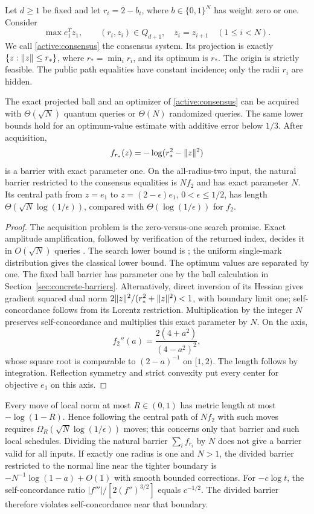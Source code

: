 Let $d\geq1$ be fixed and let $r_i=2-b_i$, where
$b\in\{0,1\}^N$ has weight zero or one. Consider
\begin{equation}\label{active:consensus}
 \max e_1^Tz_1,\qquad
 (r_i,z_i)\in Q_{d+1},\quad z_i=z_{i+1}\quad(1\leq i<N).
\end{equation}
We call \eqref{active:consensus} the consensus system.
Its projection is exactly $\{z:\lVert z\rVert\leq r_*\}$, where
$r_*=\min_i r_i$, and its optimum is $r_*$. The origin is strictly
feasible. The public path equalities have constant incidence; only
the radii $r_i$ are hidden.

\begin{proposition}\label{active:radius}
The exact projected ball and an optimizer of
\eqref{active:consensus} can be acquired with $\Theta(\sqrt N)$
quantum queries or $\Theta(N)$ randomized queries. The same lower
bounds hold for an optimum-value estimate with additive error below
$1/3$. After acquisition,
\[
 f_{r_*}(z)=-\log(r_*^2-\lVert z\rVert^2)
\]
is a barrier with exact parameter one. On the all-radius-two input,
the natural barrier restricted to the consensus equalities is $Nf_2$
and has exact
parameter $N$. Its central path from $z=e_1$ to
$z=(2-\epsilon)e_1$, $0<\epsilon\leq1/2$, has length
$\Theta(\sqrt N\log(1/\epsilon))$, compared with
$\Theta(\log(1/\epsilon))$ for $f_2$.
\end{proposition}
\begin{proof}
The acquisition problem is the zero-versus-one search promise.
Exact amplitude amplification, followed by verification of the returned
index, decides it in $O(\sqrt N)$ queries
\cite[Theorem~16]{BHMT2002}. The search lower bound is
\cite{BBBV1997}; the uniform single-mark distribution gives the
classical lower bound. The optimum values are separated by one.
The fixed ball barrier has parameter one by the ball calculation
in Section~\ref{sec:concrete-barriers}. Alternatively, direct inversion of
its Hessian gives gradient squared dual norm
$2\lVert z\rVert^2/(r_*^2+\lVert z\rVert^2)<1$, with boundary limit one;
self-concordance follows from its Lorentz restriction.
Multiplication by the integer $N$ preserves self-concordance and
multiplies this exact parameter by $N$. On the axis,
\[
 f_2''(a)=\frac{2(4+a^2)}{(4-a^2)^2},
\]
whose square root is comparable to $(2-a)^{-1}$ on $[1,2)$.
The length follows by integration. Reflection symmetry and strict
convexity put every center for objective $e_1$ on this axis.
\end{proof}

Every move of local norm at most $R\in(0,1)$ has metric length at most
$-\log(1-R)$. Hence following the central path of
$Nf_2$ with such moves requires $\Omega_R(\sqrt N\log(1/\epsilon))$
moves; this concerns only that barrier and such local schedules.
Dividing the natural barrier $\sum_if_{r_i}$ by $N$ does not give a
barrier valid for all inputs.
If exactly one radius is one and $N>1$, the divided barrier restricted
to the normal line near the tighter boundary is
$-N^{-1}\log(1-a)+O(1)$ with smooth bounded corrections.
For $-c\log t$, the self-concordance ratio
$|f'''|/[2(f'')^{3/2}]$ equals $c^{-1/2}$. The divided barrier
therefore violates self-concordance near that boundary.

